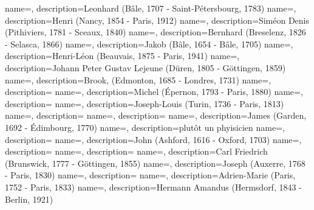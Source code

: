  {
    name=,
    description={Leonhard (Bâle, 1707 -  Saint-Pétersbourg, 1783)}
}
 {
    name=,
    description={Henri (Nancy, 1854 - Paris, 1912)}
}
 {
    name=,
    description={Siméon Denis (Pithiviers, 1781 - Sceaux, 1840)}
}
 {
    name=,
    description={Bernhard (Breselenz, 1826 - Selasca, 1866)}
}
 {
    name=,
    description={Jakob (Bâle, 1654 - Bâle, 1705)}
}
 {
    name=,
    description={Henri-Léon (Beauvais, 1875 - Paris, 1941)}
}
 {
    name=,
    description={Johann Peter Gustav Lejeune (Düren, 1805 - Göttingen, 1859)}
}
 {
    name=,
    description={Brook, (Edmonton, 1685 - Londres, 1731)}
}
 {
    name=,
    description={}
}
 {
    name=,
    description={Michel (Épernon, 1793 - Paris, 1880)}
}
 {
    name=,
    description={}
}
 {
    name=,
    description={Joseph-Louis (Turin, 1736 - Paris, 1813)}
}
 {
    name=,
    description={}
}
 {
    name=,
    description={}
}
 {
    name=,
    description={James  (Garden, 1692 - Édimbourg, 1770)}
}
 {
    name=,
    description={plutôt un phyisicien}
}
 {
    name=,
    description={}
}
 {
    name=,
    description={John  (Ashford, 1616 - Oxford, 1703)}
}
 {
    name=,
    description={}
}
 {
    name=,
    description={}
}
 {
    name=,
    description={Carl Friedrich (Brunswick, 1777 - Göttingen, 1855)}
}
 {
    name=,
    description={Joseph (Auxerre, 1768 - Paris, 1830)}
}
 {
    name=,
    description={}
}
 {
    name=,
    description={Adrien-Marie (Paris, 1752 - Paris, 1833)}
}
 {
    name=,
    description={Hermann Amandus (Hermsdorf, 1843 - Berlin, 1921)}
}
